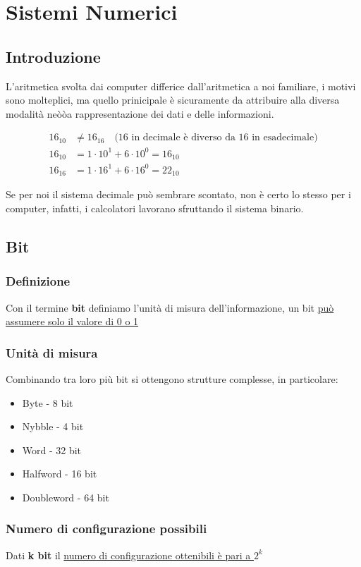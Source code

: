 \chapter{Sistemi Numerici}
\section{Introduzione}
L'aritmetica svolta dai computer differice dall'aritmetica a noi familiare, i motivi sono molteplici, ma quello prinicipale è sicuramente da attribuire alla diversa modalità neòòa rappresentazione dei dati e delle informazioni.

\begin{align*}
    16_{10} & \neq 16_{16} \quad \text{(16 in decimale è diverso da 16 in esadecimale)} \\[8pt]
    16_{10} &= 1 \cdot 10^1 + 6 \cdot 10^0 = 16_{10} \\
    16_{16} &= 1 \cdot 16^1 + 6 \cdot 16^0 = 22_{10}
\end{align*}

Se per noi il sistema decimale può sembrare scontato, non è certo lo stesso per i computer, infatti, i calcolatori lavorano sfruttando il sistema binario.

\section{Bit}
\subsection{Definizione}
Con il termine \textbf{bit} definiamo l'unità di misura dell'informazione, un bit \uline{può assumere solo il valore di 0 o 1}

\subsection{Unità di misura}
Combinando tra loro più bit si ottengono strutture complesse, in particolare:
\begin{itemize}
    \item Byte - 8 bit
    \item Nybble - 4 bit
    \item Word - 32 bit
    \item Halfword - 16 bit
    \item Doubleword - 64 bit
\end{itemize}

\subsection{Numero di configurazione possibili}
Dati \textbf{k bit} il \uline{numero di configurazione ottenibili è pari a $2^k$}

